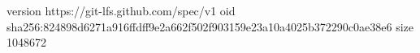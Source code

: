 version https://git-lfs.github.com/spec/v1
oid sha256:824898d6271a916ffdff9e2a662f502f903159e23a10a4025b372290c0ae38e6
size 1048672
